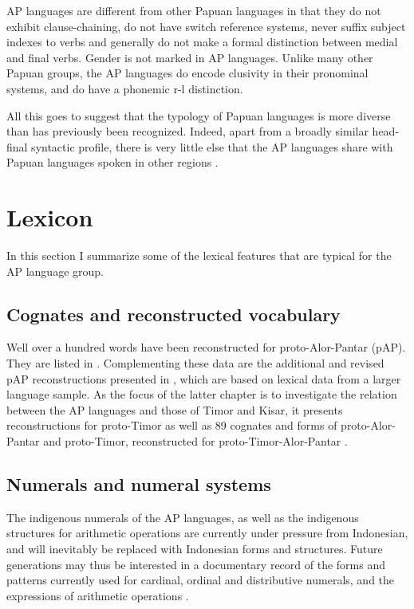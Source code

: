 {AP languages are different from other Papuan languages in that they do not exhibit clause-chaining, do not have switch reference systems, never suffix subject indexes to verbs and generally do not make a formal distinction between medial and final verbs. Gender is not marked in AP languages. Unlike many other Papuan groups, the AP languages do encode clusivity in their pronominal systems, and do have a phonemic r-l distinction. 

All this goes to suggest that the typology of Papuan languages is more diverse than has previously been recognized. Indeed, apart from a broadly similar head-final syntactic profile, there is very little else that the AP languages share with Papuan languages spoken in other regions \citep[see also][]{HoltonRobinsonTVb}.

\section{Lexicon}\label{sec:1:6}

In this section I summarize some of the lexical features that are typical for the AP language group. 

\subsection{Cognates and reconstructed vocabulary} \label{sec:1:6.1}
Well over a hundred words have been reconstructed for proto-Alor-Pantar (pAP). They are listed in \citet[Appendix]{HoltonRobinsonTVa}. Complementing these data are the additional and revised pAP reconstructions presented in \citet[Appendix 1]{SchapperEtAlTV}, which are based on lexical data from a larger language sample. As the focus of the latter chapter is to investigate the relation between the AP languages and those of Timor and Kisar, it presents reconstructions for proto-Timor as well as 89 cognates and forms of proto-Alor-Pantar and proto-Timor, reconstructed for proto-Timor-Alor-Pantar \citet[Appendix 2 and 3]{SchapperEtAlTV}.

\subsection{Numerals and numeral systems}\label{sec:1:6.2}
The indigenous numerals of the AP languages, as well as the indigenous structures for arithmetic operations are currently under pressure from Indonesian, and will inevitably be replaced with Indonesian forms and structures. Future generations may thus be interested in a documentary record of the forms and patterns currently used for cardinal, ordinal and distributive numerals, and the expressions of arithmetic operations \citep{KlamerEtAlTV}.

}
